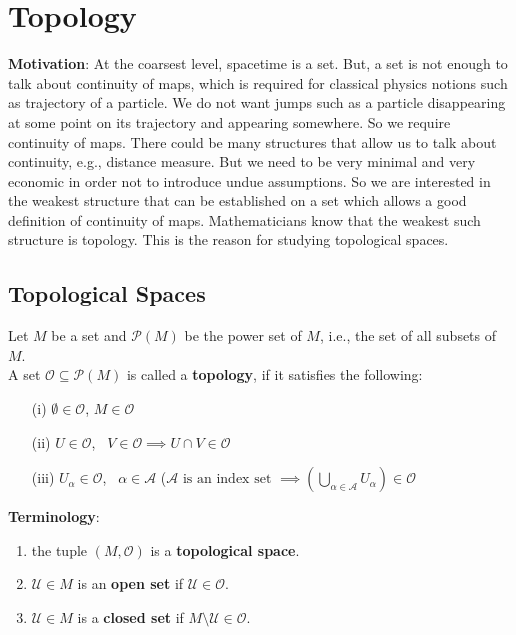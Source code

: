 \section{Topology}

\begin{framed}
\textbf{Motivation}: At the coarsest level, spacetime is a set. But, a set  is not enough to talk about continuity of maps, which is required for classical physics notions such as trajectory of a particle. We do not want jumps such as a particle disappearing at some point on its trajectory and appearing somewhere. So we require continuity of maps. There could be many structures that allow us to talk about continuity, e.g., distance measure. But we need to be very minimal and very economic in order not to introduce undue assumptions. So we are interested in the weakest structure that can be established on a set which allows a good definition of continuity of maps. Mathematicians know that the weakest such structure is topology. This is the reason for studying topological spaces.
\end{framed}

\subsection{Topological Spaces}

\begin{definition}
  Let $M$ be a set and $\mathcal{P}(M)$ be the power set of $M$, i.e., the set of all subsets of $M$.   \\
A set $\mathcal{O} \subseteq \mathcal{P}(M)$ is called a \textbf{topology}, if it satisfies the following:
\begin{enumerate}
  \item[(i)] $\emptyset \in \mathcal{O}$, $M \in \mathcal{O}$ 
\item[(ii)] $U \in \mathcal{O}$, \, $V \in \mathcal{O} \implies U \cap V \in \mathcal{O}$ 
\item[(iii)] $U_{\alpha} \in \mathcal{O}$, \, $\alpha \in \mathcal{A}$ ($\mathcal{A} \text{ is an index set } \implies \left( \bigcup_{\alpha \in \mathcal{A}} U_{\alpha} \right) \in \mathcal{O}$
\end{enumerate}
\end{definition}

\textbf{Terminology}:
\begin{enumerate}
\item the tuple $(M , \mathcal{O})$ is a \textbf{topological space}.
\item $\mathcal{U} \in M$ is an \textbf{open set} if $\mathcal{U} \in \mathcal{O}$.
\item $\mathcal{U} \in M$ is a \textbf{closed set} if $M \setminus \mathcal{U} \in \mathcal{O}$.
\end{enumerate}

